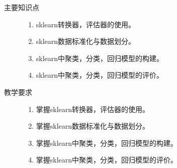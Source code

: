 \documentclass[12pt,a4paper,openany,cap]{ctexbook}
\begin{document}
\begin{description}
\item[主要知识点]
  \begin{minipage}[t]{0.8\linewidth}
    \begin{enumerate}
    \item sklearn转换器，评估器的使用。
\item\label{item:170}  sklearn数据标准化与数据划分。
\item\label{item:171}  sklearn中聚类，分类，回归模型的构建。
\item\label{item:172}  sklearn中聚类，分类，回归模型的评价。
    \end{enumerate}
  \end{minipage}

\item[教学要求]
  \begin{minipage}[t]{0.8\linewidth}
    \begin{enumerate}
    \item 掌握sklearn转换器，评估器的使用。
\item\label{item:173}  掌握sklearn数据标准化与数据划分。
\item\label{item:174}  掌握sklearn中聚类，分类，回归模型的构建。
\item\label{item:175}  掌握sklearn中聚类，分类，回归模型的评价。
    \end{enumerate}
  \end{minipage}


\end{description}
\end{document}
